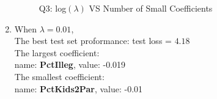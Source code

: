 \documentclass{article}
\begin{document}
\begin{enumerate}[(1)]
\begin{figure}
    \caption{Q3: log$(\lambda)$ VS Number of Small Coefficients}
    \label{fig:verticalcell}
\end{figure}
\item 
When $\lambda = 0.01$,\\
The best test set proformance: test loss = $4.18$\\
The largest coefficient: \\
  name: \textbf{PctIlleg}, value: -0.019\\
The smallest coefficient: \\
  name: \textbf{PctKids2Par}, value: -0.01
\end{enumerate}
\end{document}
